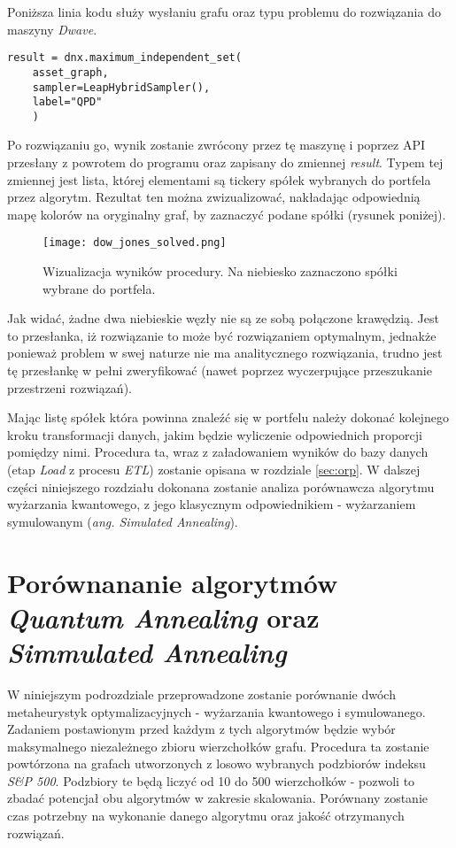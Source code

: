 \documentclass[12pt,a4paper,twoside,openany]{book}
\begin{document}
Poniższa linia kodu służy wysłaniu grafu oraz typu problemu do rozwiązania do maszyny \textit{Dwave}.

\begin{verbatim}
result = dnx.maximum_independent_set(
    asset_graph,
    sampler=LeapHybridSampler(), 
    label="QPD"
    )
\end{verbatim}

Po rozwiązaniu go, wynik zostanie zwrócony przez tę maszynę i poprzez API przesłany z powrotem do programu oraz zapisany do zmiennej \textit{result}.
Typem tej zmiennej jest lista, której elementami są tickery spółek wybranych do portfela przez algorytm.
Rezultat ten można zwizualizować, nakładając odpowiednią mapę kolorów na oryginalny graf, by zaznaczyć podane spółki (rysunek poniżej).

\begin{figure}[h!]
\texttt{[image: dow\_jones\_solved.png]}
\caption{Wizualizacja wyników procedury. Na niebiesko zaznaczono spółki wybrane do portfela.}
\end{figure}

Jak widać, żadne dwa niebieskie węzły nie są ze sobą połączone krawędzią.
Jest to przesłanka, iż rozwiązanie to może być rozwiązaniem optymalnym, jednakże ponieważ problem w swej naturze nie ma analitycznego rozwiązania, trudno jest tę przesłankę w pełni zweryfikować (nawet poprzez wyczerpujące przeszukanie przestrzeni rozwiązań).

Mając listę spółek która powinna znaleźć się w portfelu należy dokonać kolejnego kroku transformacji danych, jakim będzie wyliczenie odpowiednich proporcji pomiędzy nimi.
Procedura ta, wraz z załadowaniem wyników do bazy danych (etap \textit{Load} z procesu \textit{ETL}) zostanie opisana w rozdziale \ref{sec:orp}.
W dalszej części niniejszego rozdziału dokonana zostanie analiza porównawcza algorytmu wyżarzania kwantowego, z jego klasycznym odpowiednikiem - wyżarzaniem symulowanym (\textit{ang. Simulated Annealing}).

\section{Porównananie algorytmów \textit{Quantum Annealing} oraz \textit{Simmulated Annealing}}

W niniejszym podrozdziale przeprowadzone zostanie porównanie dwóch metaheurystyk optymalizacyjnych - wyżarzania kwantowego i symulowanego.
Zadaniem postawionym przed każdym z tych algorytmów będzie wybór maksymalnego niezależnego zbioru wierzchołków grafu.
Procedura ta zostanie powtórzona na grafach utworzonych z losowo wybranych podzbiorów indeksu \textit{S\&P 500}.
Podzbiory te będą liczyć od 10 do 500 wierzchołków - pozwoli to zbadać potencjał obu algorytmów w zakresie skalowania.
Porównany zostanie czas potrzebny na wykonanie danego algorytmu oraz jakość otrzymanych rozwiązań.
\end{document}

